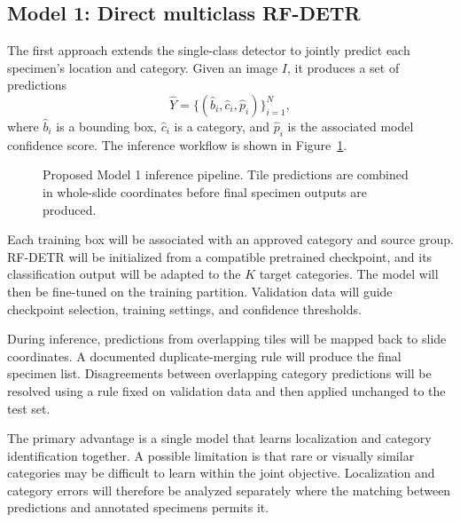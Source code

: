 \documentclass[conference,letterpaper]{IEEEtran}
\begin{document}
\subsection{Model 1: Direct multiclass RF-DETR}
The first approach extends the single-class detector to jointly predict each specimen's location and category. Given an image $I$, it produces a set of predictions
\[
\widehat{Y}=\{(\widehat{b}_i,\widehat{c}_i,\widehat{p}_i)\}_{i=1}^{N},
\]
where $\widehat{b}_i$ is a bounding box, $\widehat{c}_i$ is a category, and $\widehat{p}_i$ is the associated model confidence score. The inference workflow is shown in Figure~\ref{fig:model1}.

\begin{figure}[htbp]
\centering
{}
\caption{Proposed Model 1 inference pipeline. Tile predictions are combined in whole-slide coordinates before final specimen outputs are produced.}
\label{fig:model1}
\end{figure}

Each training box will be associated with an approved category and source group. RF-DETR will be initialized from a compatible pretrained checkpoint, and its classification output will be adapted to the $K$ target categories. The model will then be fine-tuned on the training partition. Validation data will guide checkpoint selection, training settings, and confidence thresholds.

During inference, predictions from overlapping tiles will be mapped back to slide coordinates. A documented duplicate-merging rule will produce the final specimen list. Disagreements between overlapping category predictions will be resolved using a rule fixed on validation data and then applied unchanged to the test set.

The primary advantage is a single model that learns localization and category identification together. A possible limitation is that rare or visually similar categories may be difficult to learn within the joint objective. Localization and category errors will therefore be analyzed separately where the matching between predictions and annotated specimens permits it.
\end{document}

